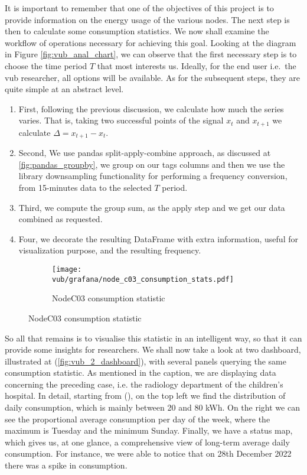 It is important to remember that one of the objectives of this project is to provide information on the energy usage of the various nodes. 
The next step is then to calculate some consumption statistics. We now shall examine the workflow of operations necessary for achieving this goal.
Looking at the diagram in Figure \ref{fig:vub_anal_chart}, we can observe that the first necessary step is to choose the time period $T$ that most interests us.
Ideally, for the end user i.e.\ the vub researcher, all options will be available.
As for the subsequent steps, they are quite simple at an abstract level.
\begin{enumerate}
    \item First, following the previous discussion, we calculate how much the series varies. 
    That is, taking two successful points of the signal $x_t$ and $x_{t+1}$ we calculate $\Delta = x_{t+1} - x_t$.
    \item Second, We use pandas split-apply-combine approach, as discussed at \ref{fig:pandas_groupby}, we group on our tags columns and then we use the library downsampling 
    functionality for performing a frequency conversion, from 15-minutes data to the selected $T$ period.
    \item Third, we compute the group sum, as the apply step and we get our data combined as requested.
    \item Four, we decorate the resulting DataFrame with extra information, useful for visualization purpose, and the resulting frequency. 
\end{enumerate}

\begin{figure}[htp]
    \begin{subfigure}{\textwidth}
        \texttt{[image: vub/grafana/node\_c03\_consumption\_stats.pdf]}
        \caption{NodeC03 consumption statistic}
        \label{fig:vub_stats_v1}
    \end{subfigure}
\end{figure}
So all that remains is to visualise this statistic in an intelligent way, so that it can provide some insights for researchers.
We shall now take a look at two dashboard, illustrated at (\ref{fig:vub_2_dashboard}), with several panels querying the same consumption statistic.
As mentioned in the caption, we are displaying data concerning the preceding case, i.e. the radiology department of the children's hospital.
In detail, starting from (), on the top left we find the distribution of daily consumption, which is mainly between 20 and 80 kWh. 
On the right we can see the proportional average consumption per day of the week, where the maximum is Tuesday and the minimum Sunday. 
Finally, we have a status map, which gives us, at one glance, a comprehensive view of long-term average daily consumption. 
For instance, we were able to notice that on 28th December 2022 there was a spike in consumption.


